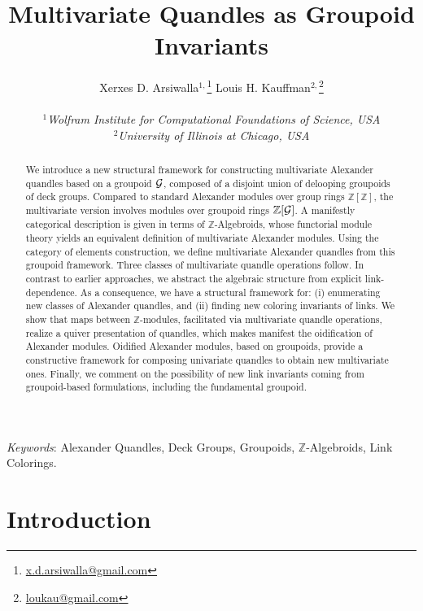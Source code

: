 \documentclass[a4paper,12pt]{article}
\date{}
\title{\bf Multivariate Quandles as Groupoid Invariants}
\author{Xerxes D. Arsiwalla$^{1, }$\footnote{\url{x.d.arsiwalla@gmail.com}}   {}  {}  {}  {}   Louis H. Kauffman$^{2, }$\footnote{\url{loukau@gmail.com}}    \\     
{ }  \\ 
{\it \small $^{1}$Wolfram Institute for Computational Foundations of Science,  USA}   \\
{\it \small $^{2}$University of Illinois at Chicago, USA} 
}
\newcommand{\Z}{\mathbb{Z}}
\begin{document}
   
\maketitle

\begin{abstract}

We introduce a new structural framework for constructing multivariate Alexander quandles based on a groupoid ${\cal G}$, composed of a disjoint union of delooping groupoids of deck groups. Compared to standard Alexander modules over group rings $\Z[\Z]$, the  multivariate version involves modules over groupoid rings $\Z[{\cal G}]$. A manifestly categorical description is given in terms of  $\Z$-Algebroids, whose functorial module theory yields an equivalent definition of multivariate Alexander modules. Using the category of elements construction, we define multivariate Alexander quandles from this groupoid framework. Three classes of multivariate quandle operations follow.  In contrast to earlier approaches, we abstract the algebraic structure from explicit link-dependence. As a consequence, we have a structural framework for: (i) enumerating new classes of Alexander quandles, and (ii) finding new coloring invariants of links. We show that maps between $\Z$-modules, facilitated via multivariate quandle operations, realize a quiver presentation of quandles, which makes manifest the oidification of Alexander modules. Oidified Alexander modules, based on groupoids, provide a constructive framework for composing  univariate quandles to obtain new multivariate ones. Finally, we comment on the possibility of new link invariants coming from groupoid-based formulations, including the fundamental groupoid.  

\end{abstract}

\vspace{2pc}
{\it Keywords}: Alexander Quandles, Deck Groups, Groupoids, $\Z$-Algebroids, Link Colorings.  
  
\clearpage

\tableofcontents


\section{Introduction}
\end{document}
